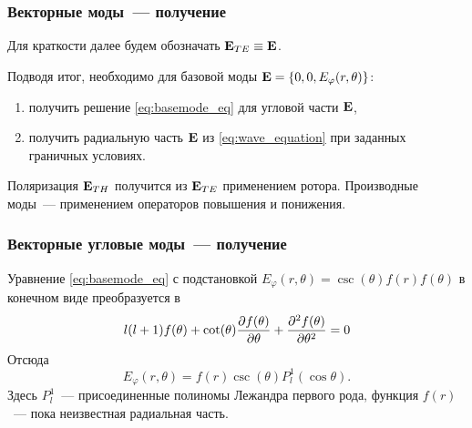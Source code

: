\documentclass[compress]{beamer}
\begin{document}
    \begin{frame}\frametitle{Векторные моды~--- получение}

        Для краткости далее будем обозначать $\vb{E}_{TE} \equiv \vb{E}$.

        Подводя итог, необходимо для базовой моды $\vb{E} = \qty{0, 0, E_\varphi(r,\theta)}$:
        \begin{enumerate}
            \item получить решение \autoref{eq:basemode_eq} для угловой части $\vb{E}$,
            \item получить радиальную часть $\vb{E}$ из \autoref{eq:wave_equation} при заданных граничных условиях.
        \end{enumerate}

        Поляризация $\vb{E}_{TH}$ получится из $\vb{E}_{TE}$ применением ротора. Производные моды~--- применением операторов повышения и понижения.

    \end{frame}


    \begin{frame}\frametitle{Векторные угловые моды~--- получение}

        Уравнение \autoref{eq:basemode_eq} с подстановкой $E_\varphi(r,\theta) = \csc(\theta) f(r) f(\theta)$ в конечном виде преобразуется в
        \begin{equation*}
            l (l + 1) f(\theta)
            + \cot(\theta) \pdv{f(\theta)}{\theta}
            + \pdv[2]{f(\theta)}{\theta} = 0
        \end{equation*}
        Отсюда
        \begin{equation}\label{eq:angle_modes_vect}
            E_\varphi(r,\theta) = f(r) \csc(\theta) P^1_l(\cos\theta) .
        \end{equation}
        Здесь $P^1_l$~--- присоединенные полиномы Лежандра первого рода, функция $f(r)$~--- пока неизвестная радиальная часть.

    \end{frame}

\end{document}
